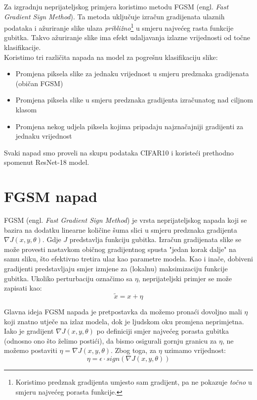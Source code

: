 Za izgradnju neprijateljskog primjera koristimo metodu FGSM (engl. \textit{Fast Gradient Sign Method}). Ta metoda uključuje izračun gradijenata ulaznih podataka i ažuriranje slike ulaza \textit{približno}\footnote{Koristimo predznak gradijenta umjesto sam gradijent, pa ne pokazuje \textit{točno} u smjeru najvećeg porasta funkcije.} u smjeru najvećeg rasta funkcije gubitka. Takvo ažuriranje slike ima efekt udaljavanja izlazne vrijednosti od točne klasifikacije. \\

Koristimo tri različita napada na model za pogrešnu klasifikaciju slike: 
\begin{itemize}
	\setlength\itemsep{-0.25em}
    \item Promjena piksela slike za jednaku vrijednost u smjeru predznaka gradijenata (običan FGSM)
    \item Promjena piksela slike u smjeru predznaka gradijenta izračunatog nad ciljnom klasom
    \item Promjena nekog udjela piksela kojima pripadaju najznačajniji gradijenti za jednaku vrijednost
\end{itemize}

Svaki napad smo proveli na skupu podataka CIFAR10 i koristeći prethodno spomenut ResNet-18 model.

\section{FGSM napad}

FGSM (engl. \textit{Fast Gradient Sign Method}) je vrsta neprijateljskog napada koji se bazira na dodatku linearne količine šuma slici u smjeru predznaka gradijenta $\nabla J(x, y, \theta)$. Gdje $J$ predstavlja funkciju gubitka. Izračun gradijenata slike se može provesti nastavkom običnog gradijentnog spusta "jedan korak dalje" na samu sliku, što efektivno tretira ulaz kao parametre modela. Kao i inače, dobiveni gradijenti predstavljaju smjer izmjene za (lokalnu) maksimizaciju funkcije gubitka. Ukoliko perturbaciju označimo sa $\eta$, neprijateljski primjer se može zapisati kao: 
\[\widetilde{x} = x + \eta\]

Glavna ideja FGSM napada je pretpostavka da možemo pronaći dovoljno mali $\eta$ koji znatno utječe na izlaz modela, dok je ljudskom oku promjena neprimjetna. Iako je gradijent $\nabla J(x, y, \theta)$ po definiciji smjer najvećeg porasta gubitka (odnosno ono što želimo postići), da bismo osigurali gornju granicu za $\eta$, ne možemo postaviti $\eta = \nabla J(x, y, \theta)$. Zbog toga, za $\eta$ uzimamo vrijednost: 
\[\eta = \epsilon \cdot sign\left(\nabla J(x, y, \theta)\right)\]

